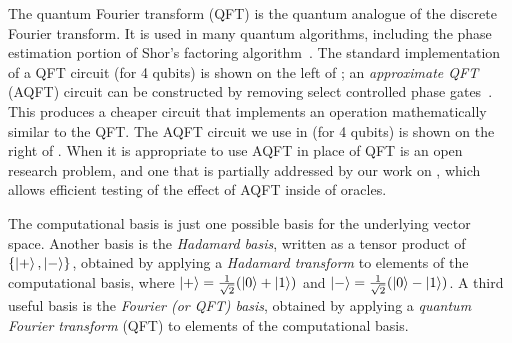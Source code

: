 The quantum Fourier transform (QFT) is the quantum analogue of the discrete Fourier transform.
It is used in many quantum algorithms, including the phase estimation portion of Shor's factoring algorithm~\cite{shors}.
The standard implementation of a QFT circuit (for 4 qubits) is shown on the left of ; an \emph{approximate QFT} (AQFT) circuit can be constructed by removing select controlled phase gates~\cite{ApproximateQFT,appox-qft2,appox-qft1}.
This produces a cheaper circuit that implements an operation mathematically similar to the QFT.\@
The AQFT circuit we use in \name (for 4 qubits) is shown on the right of . 
When it is appropriate to use AQFT in place of QFT is an open research problem, and one that is partially addressed by our work on \oqasm, which allows efficient testing of the effect of AQFT inside of oracles.

The computational basis is just one possible basis for the underlying vector space.
Another basis is the \emph{Hadamard basis},  written as a tensor product of $\{\left\vert{+}\right\rangle, \left\vert{-}\right\rangle\}$, obtained by applying a \emph{Hadamard transform} to elements of the computational basis, where $\left\vert{+}\right\rangle=\frac{1}{\sqrt{2}}(\left\vert{0}\right\rangle+\left\vert{1}\right\rangle)$ and  $\left\vert{-}\right\rangle=\frac{1}{\sqrt{2}}(\left\vert{0}\right\rangle-\left\vert{1}\right\rangle)$.
A third useful basis is the \emph{Fourier (or QFT) basis}, obtained by applying a \emph{quantum Fourier transform} (QFT) to elements of the computational basis.




